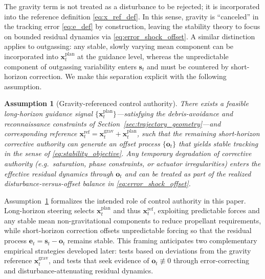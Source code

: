 \documentclass{article}
\newtheorem{assumption}{Assumption}
\begin{document}
The gravity term is not treated as a disturbance to be rejected; it is incorporated into the reference definition \eqref{eq:x_ref_def}. In this sense, gravity is ``canceled'' in the tracking error \eqref{eq:e_def} by construction, leaving the stability theory to focus on bounded residual dynamics via \eqref{eq:error_shock_offset}. A similar distinction applies to outgassing: any stable, slowly varying mean component can be incorporated into $\mathbf{x}^{\mathrm{plan}}_t$ at the guidance level, whereas the unpredictable component of outgassing variability enters $\mathbf{s}_t$ and must be countered by short-horizon correction. We make this separation explicit with the following assumption.

\begin{assumption}[Gravity-referenced control authority]
\label{ass:grav_ref_authority}
There exists a feasible long-horizon guidance signal $\{\mathbf{x}^{\mathrm{plan}}_t\}$---satisfying the debris-avoidance and reconnaissance constraints of Section~\ref{sec:trajectory_geometry}---and corresponding reference $\mathbf{x}^{\mathrm{ref}}_t=\mathbf{x}^{\mathrm{grav}}_t+\mathbf{x}^{\mathrm{plan}}_t$, such that the remaining short-horizon corrective authority can generate an offset process $\{\mathbf{o}_t\}$ that yields stable tracking in the sense of \eqref{eq:stability_objective}. Any temporary degradation of corrective authority (e.g.\ saturation, phase constraints, or actuator irregularities) enters the effective residual dynamics through $\mathbf{o}_t$ and can be treated as part of the realized disturbance-versus-offset balance in \eqref{eq:error_shock_offset}.
\end{assumption}

Assumption~\ref{ass:grav_ref_authority} formalizes the intended role of control authority in this paper. Long-horizon steering selects $\mathbf{x}^{\mathrm{plan}}_t$ and thus $\mathbf{x}^{\mathrm{ref}}_t$, exploiting predictable forces and any stable mean non-gravitational components to reduce propellant requirements, while short-horizon correction offsets unpredictable forcing so that the residual process $\mathbf{e}_t=\mathbf{s}_t-\mathbf{o}_t$ remains stable. This framing anticipates two complementary empirical strategies developed later: tests based on deviations from the gravity reference $\mathbf{x}^{\mathrm{grav}}_t$, and tests that seek evidence of $\mathbf{o}_t\not\equiv 0$ through error-correcting and disturbance-attenuating residual dynamics.

\end{document}
